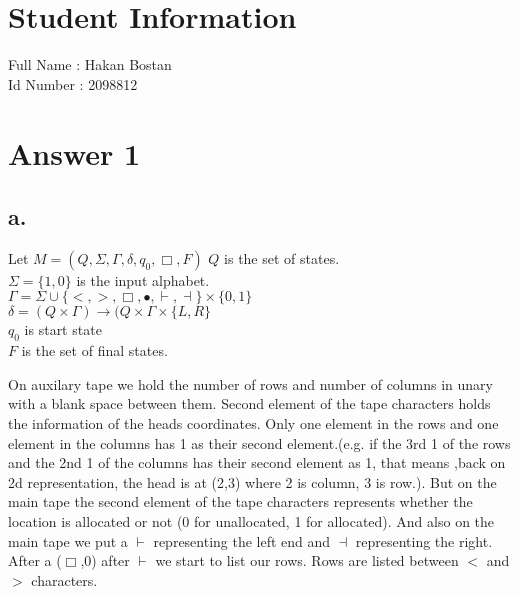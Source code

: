 \documentclass[12pt]{article}
\begin{document}
\section*{Student Information } 
Full Name : Hakan Bostan\\
Id Number : 2098812 \\

\section*{Answer 1}

\subsection*{a.}
Let $M=(Q,\Sigma ,\Gamma ,\delta ,q_0 , \Box ,F)$
$Q$ is the set of states.\\
$\Sigma = \{1,0\}$ is the input alphabet.\\
$\Gamma = \Sigma \cup \{<,>,\Box, \bullet,\vdash,\dashv\} \times \{0,1\}$\\
$\delta = (Q \times \Gamma) \rightarrow (Q \times \Gamma \times \{L,R\}$\\
$q_0$ is start state\\
$F$ is the set of final states.

On auxilary tape we hold the number of rows and number of columns in unary with a blank space between them. Second element of the tape characters holds the information of the heads coordinates. Only one element in the rows and one element in the columns has 1 as their second element.(e.g. if the 3rd 1 of the rows and the 2nd 1 of the columns has their second element as 1, that means ,back on 2d representation, the head is at (2,3) where 2 is column, 3 is row.). But on the main tape the second element of the tape characters represents whether the location is allocated or not (0 for unallocated, 1 for allocated). And also on the main tape we put a $\vdash$ representing the left end and $\dashv$ representing the right. After a ($\Box$,0) after $\vdash$ we start to list our rows. Rows are listed between $<$ and $>$ characters.\\
\end{document}

